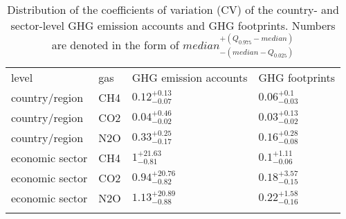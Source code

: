 \begin{table}

\caption{\label{tab:cvs}Distribution of the coefficients of variation (CV) of 
                the country- and sector-level GHG emission accounts and GHG footprints. 
                Numbers are denoted in the form of 
                $median^{+(Q_{0.975}-median)}_{-(median - Q_{0.025})}$}
\centering
\begin{tabular}[t]{llll}
\tophline
level & gas & GHG emission accounts & GHG footprints\\
\middlehline
country/region & CH4 & $0.12^{+0.13}_{-0.07}$ & $0.06^{+0.1}_{-0.03}$\\
country/region & CO2 & $0.04^{+0.46}_{-0.02}$ & $0.03^{+0.13}_{-0.02}$\\
country/region & N2O & $0.33^{+0.25}_{-0.17}$ & $0.16^{+0.28}_{-0.08}$\\
economic sector & CH4 & $1^{+21.63}_{-0.81}$ & $0.1^{+1.11}_{-0.06}$\\
economic sector & CO2 & $0.94^{+20.76}_{-0.82}$ & $0.18^{+3.57}_{-0.15}$\\
economic sector & N2O & $1.13^{+20.89}_{-0.88}$ & $0.22^{+1.58}_{-0.16}$\\
\bottomhline
\end{tabular}
\end{table}
